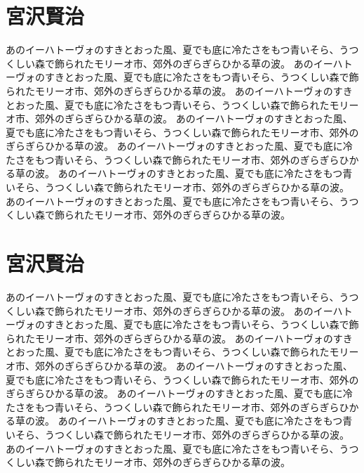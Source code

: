\documentclass[b5j,12pt]{ltjsbook}
\begin{document}
\section{宮沢賢治}

あのイーハトーヴォのすきとおった風、夏でも底に冷たさをもつ青いそら、うつくしい森で飾られたモリーオ市、郊外のぎらぎらひかる草の波。
あのイーハトーヴォのすきとおった風、夏でも底に冷たさをもつ青いそら、うつくしい森で飾られたモリーオ市、郊外のぎらぎらひかる草の波。
あのイーハトーヴォのすきとおった風、夏でも底に冷たさをもつ青いそら、うつくしい森で飾られたモリーオ市、郊外のぎらぎらひかる草の波。
あのイーハトーヴォのすきとおった風、夏でも底に冷たさをもつ青いそら、うつくしい森で飾られたモリーオ市、郊外のぎらぎらひかる草の波。
あのイーハトーヴォのすきとおった風、夏でも底に冷たさをもつ青いそら、うつくしい森で飾られたモリーオ市、郊外のぎらぎらひかる草の波。
あのイーハトーヴォのすきとおった風、夏でも底に冷たさをもつ青いそら、うつくしい森で飾られたモリーオ市、郊外のぎらぎらひかる草の波。
あのイーハトーヴォのすきとおった風、夏でも底に冷たさをもつ青いそら、うつくしい森で飾られたモリーオ市、郊外のぎらぎらひかる草の波。

\section{宮沢賢治}

あのイーハトーヴォのすきとおった風、夏でも底に冷たさをもつ青いそら、うつくしい森で飾られたモリーオ市、郊外のぎらぎらひかる草の波。
あのイーハトーヴォのすきとおった風、夏でも底に冷たさをもつ青いそら、うつくしい森で飾られたモリーオ市、郊外のぎらぎらひかる草の波。
あのイーハトーヴォのすきとおった風、夏でも底に冷たさをもつ青いそら、うつくしい森で飾られたモリーオ市、郊外のぎらぎらひかる草の波。
あのイーハトーヴォのすきとおった風、夏でも底に冷たさをもつ青いそら、うつくしい森で飾られたモリーオ市、郊外のぎらぎらひかる草の波。
あのイーハトーヴォのすきとおった風、夏でも底に冷たさをもつ青いそら、うつくしい森で飾られたモリーオ市、郊外のぎらぎらひかる草の波。
あのイーハトーヴォのすきとおった風、夏でも底に冷たさをもつ青いそら、うつくしい森で飾られたモリーオ市、郊外のぎらぎらひかる草の波。
あのイーハトーヴォのすきとおった風、夏でも底に冷たさをもつ青いそら、うつくしい森で飾られたモリーオ市、郊外のぎらぎらひかる草の波。
\end{document}
